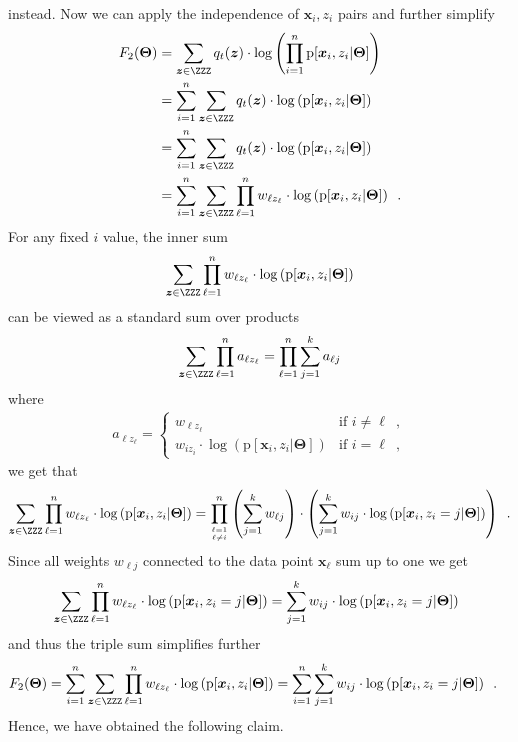 \documentclass{article}
\renewcommand{\vec}[1]{\boldsymbol{#1}}
\newcommand{\pd}[1]{\mathrm{p}[#1]}
\begin{document}
instead. Now we can apply the independence of $\vec{x}_i, z_i$ pairs and further simplify
\begin{align*}
F_2(\vec{\Theta})&=
\sum_{\vec{z}\in\ZZZ} q_{t}(\vec{z})\cdot\log\left(\prod_{i=1}^n\pd{\vec{x}_i,z_i|\vec{\Theta}}\right)\\ 
&=\sum_{i=1}^n \sum_{\vec{z}\in\ZZZ} q_{t}(\vec{z})\cdot\log\left(\pd{\vec{x}_i,z_i|\vec{\Theta}}\right)\\ 
&=\sum_{i=1}^n \sum_{\vec{z}\in\ZZZ} q_{t}(\vec{z})\cdot\log\left(\pd{\vec{x}_i,z_i|\vec{\Theta}}\right) \\
&=\sum_{i=1}^n \sum_{\vec{z}\in\ZZZ}\prod_{\ell=1}^n w_{\ell z_\ell}\cdot\log\left(\pd{\vec{x}_i,z_i|\vec{\Theta}}\right)
\enspace.
\end{align*}
For any fixed $i$ value, the inner sum 
\begin{align*}
\sum_{\vec{z}\in\ZZZ}\prod_{\ell=1}^n 
 w_{\ell z_\ell}\cdot\log\left(\pd{\vec{x}_i,z_i|\vec{\Theta}}\right)
\end{align*}
can be viewed as a standard sum over products 
\begin{align*}
\sum_{\vec{z}\in\ZZZ}\prod_{\ell=1}^n 
a_{\ell z_\ell}=\prod_{\ell=1}^n\sum_{j=1}^k a_{\ell j}
\end{align*}
where 
\begin{align*}
a_{\ell z_\ell}=
\begin{cases}
w_{\ell z_\ell} &\text{if } i\neq \ell\enspace,\\
w_{i z_i}\cdot \log\left(\pd{\vec{x}_i,z_i|\vec{\Theta}}\right) &\text{if } i= \ell\enspace,
\end{cases}
\end{align*} 
we get that
\begin{align*}
\sum_{\vec{z}\in\ZZZ}\prod_{\ell=1}^n 
 w_{\ell z_\ell}\cdot\log\left(\pd{\vec{x}_i,z_i|\vec{\Theta}}\right)
= 
\prod_{\ell=1\atop \ell\neq i}^n\left(\sum_{j=1}^k w_{\ell j}\right)\cdot
\left(\sum_{j=1}^k w_{ij}\cdot \log\left(\pd{\vec{x}_i,z_i=j|\vec{\Theta}}\right)\right)\enspace.
\end{align*}
Since all weights $w_{\ell j}$ connected to the data point $\vec{x}_\ell$ sum up to one we get
\begin{align*}
\sum_{\vec{z}\in\ZZZ}\prod_{\ell=1}^n 
 w_{\ell z_\ell}\cdot\log\left(\pd{\vec{x}_i,z_i=j|\vec{\Theta}}\right)
= \sum_{j=1}^k w_{ij}\cdot \log \left(\pd{\vec{x}_i,z_i=j|\vec{\Theta}}\right)\enspace
\end{align*}
and thus the triple sum simplifies further
\begin{align*}
F_2(\vec{\Theta})
&=\sum_{i=1}^n \sum_{\vec{z}\in\ZZZ}\prod_{\ell=1}^n w_{\ell z_\ell}\cdot\log\left(\pd{\vec{x}_i,z_i|\vec{\Theta}}\right)
=\sum_{i=1}^n \sum_{j=1}^k w_{ij}\cdot \log \left(\pd{\vec{x}_i,z_i=j|\vec{\Theta}}\right)
\enspace.
\end{align*}
Hence, we have obtained the following claim.
\end{document}
